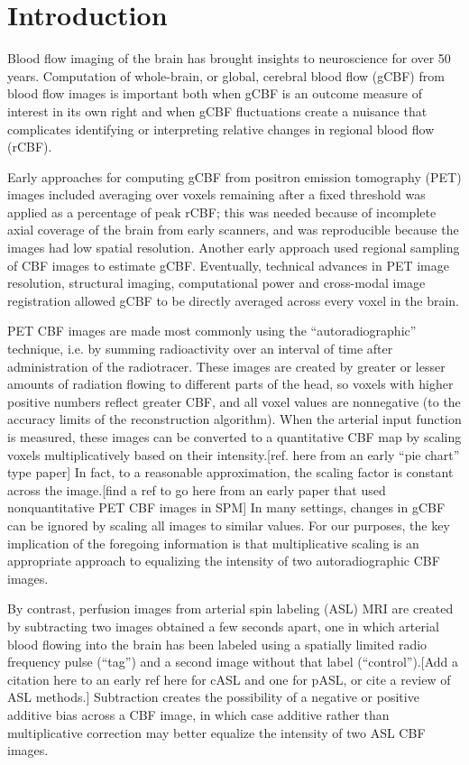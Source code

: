 \section{Introduction}
Blood flow imaging of the brain has brought insights to neuroscience for over 50 years.\cite{Taber_2005} Computation of whole-brain, or global, cerebral blood flow (gCBF) from blood flow images is important both when gCBF is an outcome measure of interest in its own right and when gCBF fluctuations create a nuisance that complicates identifying or interpreting relative changes in regional blood flow (rCBF).\cite{Small_2004} 

Early approaches for computing gCBF from positron emission tomography (PET) images included averaging over voxels remaining after a fixed threshold was applied as a percentage of peak rCBF; this was needed because of incomplete axial coverage of the brain from early scanners, and was reproducible because the images had low spatial resolution.\cite{6609680} Another early approach used regional sampling of CBF images to estimate gCBF.\cite{6971299}\cite{Perlmutter_1985} Eventually, technical advances in PET image resolution, structural imaging, computational power and cross-modal image registration allowed gCBF to be directly averaged across every voxel in the brain.

PET CBF images are made most commonly using the ``autoradiographic'' technique, i.e. by summing radioactivity over an interval of time after administration of the radiotracer. These images are created by greater or lesser amounts of radiation flowing to different parts of the head, so voxels with higher positive numbers reflect greater CBF, and all voxel values are nonnegative (to the accuracy limits of the reconstruction algorithm). When the arterial input function is measured, these images can be converted to a quantitative CBF map by scaling voxels multiplicatively based on their intensity.[ref. here from an early ``pie chart'' type paper] In fact, to a reasonable approximation, the scaling factor is constant across the image.[find a ref to go here from an early paper that used nonquantitative PET CBF images in SPM] In many settings, changes in gCBF can be ignored by scaling all images to similar values. For our purposes, the key implication of the foregoing information is that multiplicative scaling is an appropriate approach to equalizing the intensity of two autoradiographic CBF images.

By contrast, perfusion images from arterial spin labeling (ASL) MRI are created by subtracting two images obtained a few seconds apart, one in which arterial blood flowing into the brain has been labeled using a spatially limited radio frequency pulse (``tag'') and a second image without that label (``control'').[Add a citation here to an early ref here for cASL and one for pASL, or cite a review of ASL methods.] Subtraction creates the possibility of a negative or positive additive bias across a CBF image, in which case additive rather than multiplicative correction may better equalize the intensity of two ASL CBF images.

